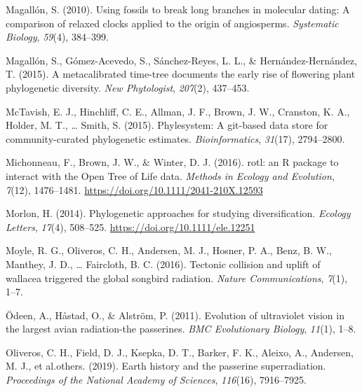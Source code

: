 \documentclass[
  man]{apa6}
\newlength{\cslhangindent}
\newlength{\cslentryspacingunit} %
\newenvironment{CSLReferences}[2] %
 {%
  \setlength{\parindent}{0pt}
  \ifodd #1
  \let\oldpar\par
  \def\par{\hangindent=\cslhangindent\oldpar}
  \fi
  \setlength{\parskip}{#2\cslentryspacingunit}
 }%
 {}
\begin{document}
\begin{CSLReferences}{1}{0}
\leavevmode{}%
Magallón, S. (2010). Using fossils to break long branches in molecular dating: A comparison of relaxed clocks applied to the origin of angiosperms. \emph{Systematic Biology}, \emph{59}(4), 384--399.

\leavevmode{}%
Magallón, S., Gómez-Acevedo, S., Sánchez-Reyes, L. L., \& Hernández-Hernández, T. (2015). A metacalibrated time-tree documents the early rise of flowering plant phylogenetic diversity. \emph{New Phytologist}, \emph{207}(2), 437--453.

\leavevmode{}%
McTavish, E. J., Hinchliff, C. E., Allman, J. F., Brown, J. W., Cranston, K. A., Holder, M. T., \ldots{} Smith, S. (2015). Phylesystem: A git-based data store for community-curated phylogenetic estimates. \emph{Bioinformatics}, \emph{31}(17), 2794--2800.

\leavevmode{}%
Michonneau, F., Brown, J. W., \& Winter, D. J. (2016). {rotl: an R package to interact with the Open Tree of Life data}. \emph{{Methods in Ecology and Evolution}}, \emph{7}(12), 1476--1481. \url{https://doi.org/10.1111/2041-210X.12593}

\leavevmode{}%
Morlon, H. (2014). {Phylogenetic approaches for studying diversification.} \emph{{Ecology Letters}}, \emph{17}(4), 508--525. \url{https://doi.org/10.1111/ele.12251}

\leavevmode{}%
Moyle, R. G., Oliveros, C. H., Andersen, M. J., Hosner, P. A., Benz, B. W., Manthey, J. D., \ldots{} Faircloth, B. C. (2016). Tectonic collision and uplift of wallacea triggered the global songbird radiation. \emph{Nature Communications}, \emph{7}(1), 1--7.

\leavevmode{}%
Ödeen, A., Håstad, O., \& Alström, P. (2011). Evolution of ultraviolet vision in the largest avian radiation-the passerines. \emph{BMC Evolutionary Biology}, \emph{11}(1), 1--8.

\leavevmode{}%
Oliveros, C. H., Field, D. J., Ksepka, D. T., Barker, F. K., Aleixo, A., Andersen, M. J., et al.others. (2019). Earth history and the passerine superradiation. \emph{Proceedings of the National Academy of Sciences}, \emph{116}(16), 7916--7925.


\end{CSLReferences}
\end{document}
